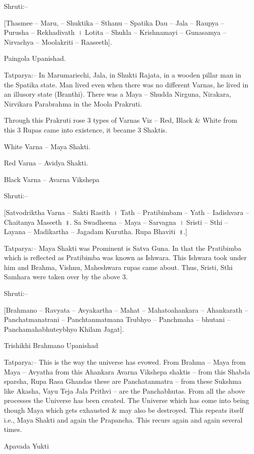 Shruti:–

[Thasmee – Maru, – Shuktika – Sthanu – Spatika Dau – Jala – Raupya – Purusha – Rekhadivath~। Lotita – Shukla – Krishnamayi – Gunasamya – Nirvachya – Moolakriti – Raaseeth].

Paingola Upanishad.

Tatparya:– In Marumariechi, Jala, in Shukti Rajata, in a wooden pillar man in the Spatika state. Man lived even when there was no different Varnas, he lived in an illusory state (Branthi). There was a Maya – Shudda Nirguna, Nirakara, Nirvikara Parabrahma in the Moola Prakruti.

Through this Prakruti rose 3 types of Varnas Viz – Red, Black \& White from this 3 Rupas came into existence, it became 3 Shaktis.

White Varna – Maya Shakti.

Red Varna – Avidya Shakti.

Black Varna – Avarna Vikshepa

Shruti:–

[Satvodriktha Varna – Sakti Rasith~। Tath – Pratibimbam – Yath – Iadishvara – Chaitanya Maseeth~॥. Sa Swadheena – Maya – Sarvagna~। Sristi – Sthi – Layana – Madikartha – Jagadam Kurutha. Rupa Bhaviti~॥.]

Tatparya:– Maya Shakti was Prominent is Satva Guna. In that the Pratibimba which is reflected as Pratibimba was known as Ishwara. This Ishwara took under him and Brahma, Vishnu, Maheshwara rupas came about. Thus, Sristi, Sthi Samhara were taken over by the above 3.

Shruti:–

[Brahmano – Ravyata – Avyakartha – Mahat – Mahatoahankara – Ahankarath – Panchatmanatrani – Panchtanmatmana Trubhyo – Panchmaha – bhutani – Panchamahabhuteybhyo Khilam Jagat].

Trishikhi Brahmano Upanishad

Tatparya:– This is the way the universe has evowed. From Brahma – Maya from Maya – Avyatha from this Ahankara Avarna Vikshepa shaktis – from this Shabda sparsha, Rupa Rasa Ghandas these are Panchatanmatra – from these Sukshma like Akasha, Vayu Teja Jala Prithvi – are the Panchabhutas. From all the above processes the Universe has been created. The Universe which has come into being though Maya which gets exhausted \& may also be destroyed. This repeats itself i.e., Maya Shakti and again the Prapancha. This recurs again and again several times.

Apavada Yukti

